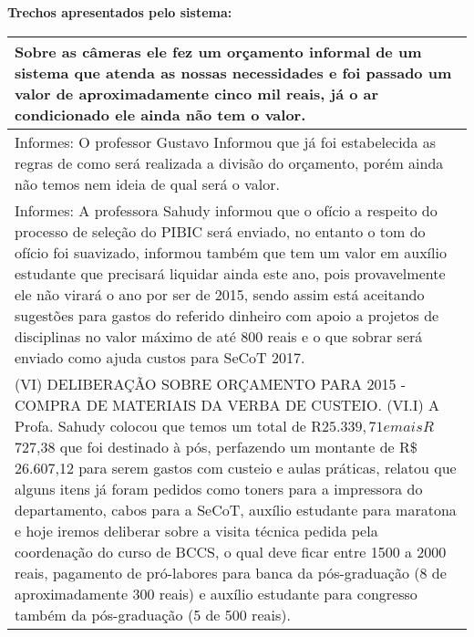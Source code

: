 \noindent
\textbf{Trechos apresentados pelo sistema:}
\begin{longtable}{|p{17.5cm}|}
\hline 
Sobre as câmeras ele fez um orçamento informal de um sistema que atenda as nossas necessidades e foi passado um valor de aproximadamente cinco mil reais, já o ar condicionado ele ainda não tem o valor.

 \\ \hline 
Informes: O professor Gustavo Informou que já foi estabelecida as regras de como será realizada a divisão do orçamento, porém ainda não temos nem ideia de qual será o valor.

 \\ \hline 
Informes: A professora Sahudy informou que o ofício a respeito do processo de seleção do PIBIC será enviado, no entanto o tom do ofício foi suavizado, informou também que tem um valor em auxílio estudante que precisará liquidar ainda este ano, pois provavelmente ele não virará o ano por ser de 2015, sendo assim está aceitando sugestões para gastos do referido dinheiro com apoio a projetos de disciplinas no valor máximo de até 800 reais e o que sobrar será enviado como ajuda custos para SeCoT 2017.

 \\ \hline 
(VI) DELIBERAÇÃO SOBRE ORÇAMENTO PARA 2015 - COMPRA DE MATERIAIS DA VERBA DE CUSTEIO. (VI.I) A Profa. Sahudy colocou que temos um total de R$ 25.339,71 e mais R$ 727,38 que foi destinado à pós, perfazendo um montante de R\$ 26.607,12 para serem gastos com custeio e aulas práticas, relatou que alguns itens já foram pedidos como toners para a impressora do departamento, cabos para a SeCoT, auxílio estudante para maratona e hoje iremos deliberar sobre a visita técnica pedida pela coordenação do curso de BCCS, o qual deve ficar entre 1500 a 2000 reais, pagamento de pró-labores para banca da pós-graduação (8 de aproximadamente 300 reais) e auxílio estudante para congresso também da pós-graduação (5 de 500 reais).


\end{longtable}
